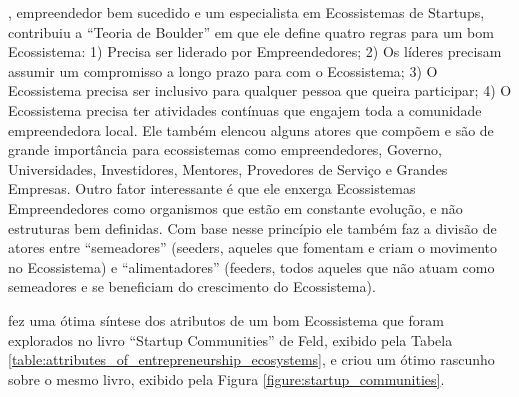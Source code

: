 , empreendedor bem sucedido e um especialista em Ecossistemas de Startups, contribuiu a ``Teoria de Boulder'' em que ele define quatro regras para um bom Ecossistema: 1) Precisa ser liderado por Empreendedores; 2) Os líderes precisam assumir um compromisso a longo prazo para com o Ecossistema; 3) O Ecossistema precisa ser inclusivo para qualquer pessoa que queira participar; 4) O Ecossistema precisa ter atividades contínuas que engajem toda a comunidade empreendedora local. Ele também elencou alguns atores que compõem e são de grande importância para ecossistemas como empreendedores, Governo, Universidades, Investidores, Mentores, Provedores de Serviço e Grandes Empresas. Outro fator interessante é que ele enxerga Ecossistemas Empreendedores como organismos que estão em constante evolução, e não estruturas bem definidas. Com base nesse princípio ele também faz a divisão de atores entre ``semeadores'' (seeders, aqueles que fomentam e criam o movimento no Ecossistema) e ``alimentadores'' (feeders, todos aqueles que não atuam como semeadores e se beneficiam do crescimento do Ecossistema). 

 fez uma ótima síntese dos atributos de um bom Ecossistema que foram explorados no livro ``Startup Communities'' de Feld, exibido pela Tabela \ref{table:attributes_of_entrepreneurship_ecosystems}, e  criou um ótimo rascunho sobre o mesmo livro, exibido pela Figura \ref{figure:startup_communities}.

